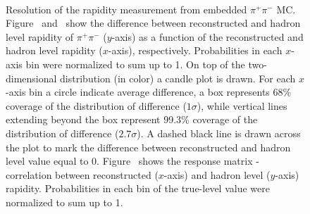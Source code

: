 \begin{figure}[h]
\parbox{0.4725\textwidth}{
  \centering
  \begin{subfigure}[b]{\linewidth}\addtocounter{subfigure}{-2}\vspace*{-12pt}
  \end{subfigure}\\
    \begin{minipage}[t][1.042\linewidth][t]{\linewidth}\vspace{10pt}
    \caption[Resolution of the rapidity measurement from embedded $\pi^{+}\pi^{-}$ MC.]{Resolution of the rapidity measurement from embedded $\pi^{+}\pi^{-}$ MC. Figure~ and~ show the difference between reconstructed and hadron level rapidity of $\pi^{+}\pi^{-}$ ($y$-axis) as a function of the reconstructed and hadron level rapidity ($x$-axis), respectively. Probabilities in each $x$-axis bin were normalized to sum up to 1. On top of the two-dimensional distribution (in color) a candle plot is drawn. For each $x$-axis bin a circle indicate average difference, a box represents 68\% coverage of the distribution of difference ($1\sigma$), while vertical lines extending beyond the box represent 99.3\% coverage of the distribution of difference ($2.7\sigma$). A dashed black line is drawn across the plot to mark the difference between reconstructed and hadron level value equal to 0. Figure~ shows the response matrix - correlation between reconstructed ($x$-axis) and hadron level ($y$-axis) rapidity. Probabilities in each bin of the true-level value were normalized to sum up to 1.}\label{fig:Response_PairRapidity}%
  \end{minipage}
}%
\end{figure}


